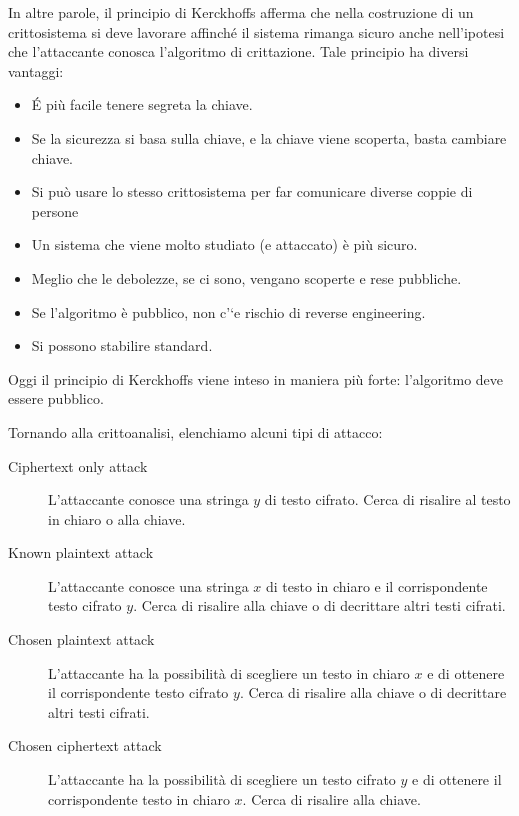 	In altre parole, il principio di Kerckhoffs afferma che nella costruzione di un crittosistema si deve lavorare affinché il sistema rimanga sicuro anche nell'ipotesi che l'attaccante conosca l'algoritmo di crittazione. Tale principio ha diversi vantaggi:
	\begin{itemize}
		\item \'E più facile tenere segreta la chiave.
		\item Se la sicurezza si basa sulla chiave, e la chiave viene scoperta, basta cambiare chiave.
		\item Si può usare lo stesso crittosistema per far comunicare diverse coppie di persone
		\item Un sistema che viene molto studiato (e attaccato) è più sicuro.
		\item Meglio che le debolezze, se ci sono, vengano scoperte e rese pubbliche.
		\item Se l'algoritmo è pubblico, non c’`e rischio di reverse engineering.
		\item Si possono stabilire standard.
	\end{itemize}
	Oggi il principio di Kerckhoffs viene inteso in maniera più forte: l'algoritmo deve essere pubblico.

	Tornando alla crittoanalisi, elenchiamo alcuni tipi di attacco:
	\begin{description}
		\item[Ciphertext only attack] L'attaccante conosce una stringa \(y\) di testo cifrato. Cerca di risalire al testo in chiaro o alla chiave.
		\item[Known plaintext attack] L'attaccante conosce una stringa \(x\) di testo in chiaro e il corrispondente testo cifrato \(y\). Cerca di risalire alla chiave o di decrittare altri testi cifrati.
		\item[Chosen plaintext attack] L'attaccante ha la possibilità di scegliere un testo in chiaro \(x\) e di ottenere il corrispondente testo cifrato \(y\). Cerca di risalire alla chiave o di decrittare altri testi cifrati.
		\item[Chosen ciphertext attack] L'attaccante ha la possibilità di scegliere un testo cifrato \(y\) e di ottenere il corrispondente testo in chiaro \(x\). Cerca di risalire alla chiave.
	\end{description}